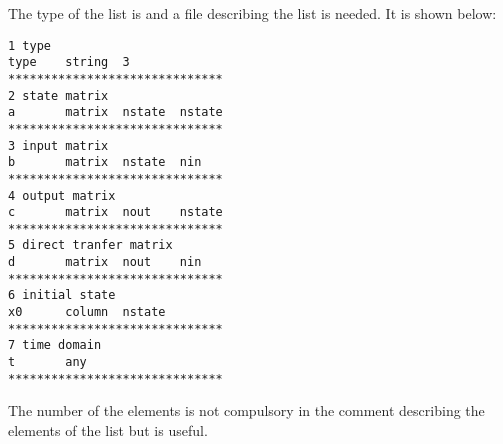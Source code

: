 The type of the list is  and a file describing the list  is
needed. It is shown below:

\begin{verbatim}
1 type
type    string  3
******************************
2 state matrix
a       matrix  nstate  nstate
******************************
3 input matrix
b       matrix  nstate  nin
******************************
4 output matrix
c       matrix  nout    nstate
******************************
5 direct tranfer matrix
d       matrix  nout    nin
******************************
6 initial state
x0      column  nstate
******************************
7 time domain
t       any
******************************
\end{verbatim}

The number of the elements is not compulsory in the comment describing the
elements of the list but is useful.
\newpage

\tableofcontents

\listoftables


